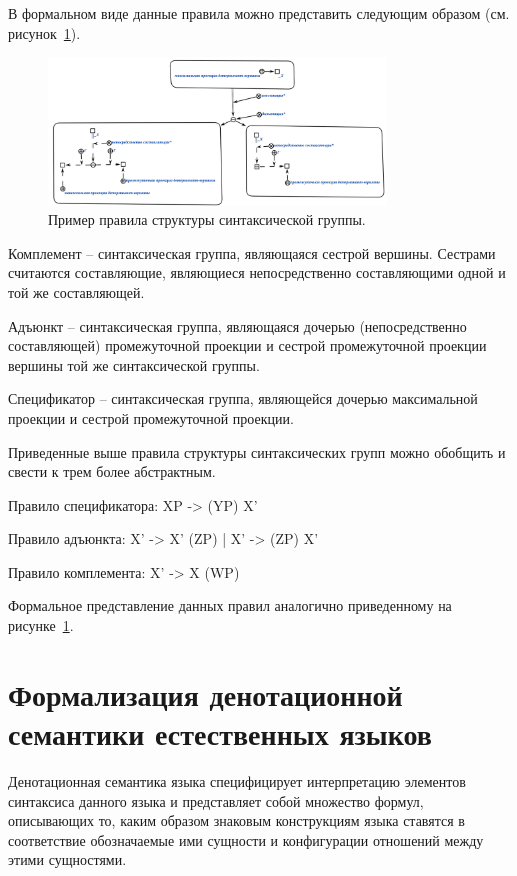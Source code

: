 В формальном виде данные правила можно представить следующим образом (см. рисунок~\ref{fig:pic_tree_structure_rule}).

\begin{figure}[h]
    \centering
    \includegraphics[width=0.8\textwidth]{images/part2/chapter_lang/tree_structure_rule.png}
    \caption{Пример правила структуры синтаксической группы.}
    \label{fig:pic_tree_structure_rule}
\end{figure}

Комплемент -- синтаксическая группа, являющаяся сестрой вершины. Сестрами считаются составляющие, являющиеся непосредственно составляющими одной и той же составляющей.

Адъюнкт -- синтаксическая группа, являющаяся дочерью (непосредственно составляющей) промежуточной проекции и сестрой промежуточной проекции вершины той же синтаксической группы.

Спецификатор -- синтаксическая группа, являющейся дочерью максимальной проекции и сестрой промежуточной проекции.

Приведенные выше правила структуры синтаксических групп можно обобщить и свести к трем более абстрактным.

Правило спецификатора: XP -> (YP) X'

Правило адъюнкта: X' -> X' (ZP) | X' -> (ZP) X'

Правило комплемента: X' -> X (WP)

Формальное представление данных правил аналогично приведенному на рисунке~\ref{fig:pic_tree_structure_rule}.

\section{Формализация денотационной семантики естественных языков}

Денотационная семантика языка специфицирует интерпретацию элементов синтаксиса данного языка и представляет собой множество формул, описывающих то, каким образом знаковым конструкциям языка ставятся в соответствие обозначаемые ими сущности и конфигурации отношений между этими сущностями.

